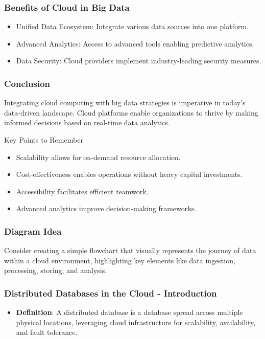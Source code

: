 \documentclass[aspectratio=169]{beamer}
\begin{document}
\begin{frame}[fragile]
  \frametitle{Benefits of Cloud in Big Data}
  \begin{itemize}
    \item Unified Data Ecosystem: Integrate various data sources into one platform.
    \item Advanced Analytics: Access to advanced tools enabling predictive analytics.
    \item Data Security: Cloud providers implement industry-leading security measures.
  \end{itemize}
\end{frame}

\begin{frame}[fragile]
  \frametitle{Conclusion}
  Integrating cloud computing with big data strategies is imperative in today’s data-driven landscape. 
  Cloud platforms enable organizations to thrive by making informed decisions based on real-time data analytics.
  
  \begin{block}{Key Points to Remember}
    \begin{itemize}
      \item Scalability allows for on-demand resource allocation.
      \item Cost-effectiveness enables operations without heavy capital investments.
      \item Accessibility facilitates efficient teamwork.
      \item Advanced analytics improve decision-making frameworks.
    \end{itemize}
  \end{block}
\end{frame}

\begin{frame}[fragile]
  \frametitle{Diagram Idea}
  Consider creating a simple flowchart that visually represents the journey of data within a cloud environment, highlighting key elements like data ingestion, processing, storing, and analysis.
\end{frame}

\begin{frame}[fragile]
    \frametitle{Distributed Databases in the Cloud - Introduction}
    \begin{itemize}
        \item \textbf{Definition}: A distributed database is a database spread across multiple physical locations, leveraging cloud infrastructure for scalability, availability, and fault tolerance.
    \end{itemize}
\end{frame}
\end{document}

